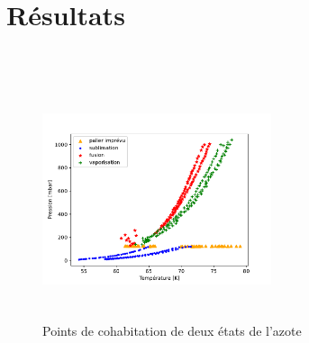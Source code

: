 \section{Résultats}

 





 \\



\begin{figure}
    \centering
    \includegraphics[width=0.6\textwidth, height=7cm]{figures/etats_azote_all_data.pdf}
    \caption{Points de cohabitation de deux états de l'azote}
    \label{fig:alldata}
\end{figure}

